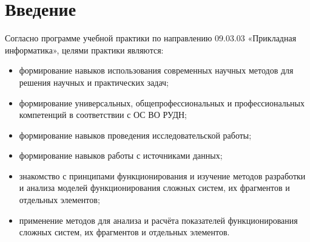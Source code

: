 \chapter*{Введение}





Согласно программе учебной практики по направлению 09.03.03
«Прикладная информатика», целями практики являются:
\begin{itemize}
\item формирование навыков использования современных научных методов
  для решения научных и практических задач;
\item формирование универсальных, общепрофессиональных и
  профессиональных компетенций в соответствии с ОС ВО РУДН;
\item формирование навыков проведения исследовательской работы;
\item формирование навыков работы с источниками данных;
\item знакомство с принципами функционирования и изучение методов разработки и анализа моделей функционирования сложных систем, их фрагментов и отдельных элементов;
\item применение методов для анализа и расчёта показателей функционирования сложных систем, их фрагментов и отдельных элементов.
\end{itemize}

